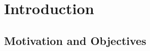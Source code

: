 




\chapter{Introduction}
\label{ch:introduction}

\section{Motivation and Objectives}
\label{sec:intro:motivation}


